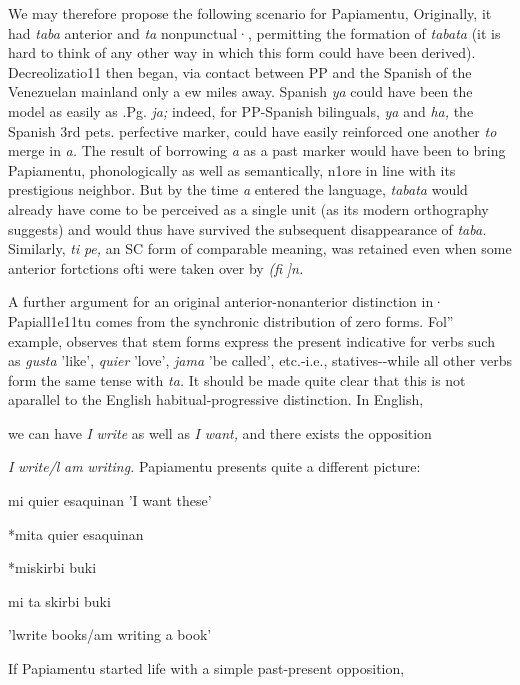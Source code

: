 We may therefore propose the following scenario for Papia\-mentu, Originally, it had \textit{taba} anterior and \textit{ta} nonpunctual·, permitting the formation of \textit{tabata} (it is hard to think of any other way in which this form could have been derived). Decreolizatio11 then began, via contact between PP and the Spanish of the Venezuelan mainland only a ew miles away. Spanish \textit{ya }could have been the model as easily as .Pg. \textit{ja;} indeed, for PP-Spanish bilinguals, \textit{ya }and \textit{ha,} the Spanish 3rd pets. perfective marker, could have easily reinforced one another \textit{to} merge in \textit{a.} The result of borrowing \textit{a} as a past marker would have been to bring Papiamentu, phonologically as well as semantically, n1ore in line with its prestigious neighbor. But by the time \textit{a} entered the language, \textit{tabata} would already have come to be perceived as a single unit (as its modern orthography suggests) and would thus have survived the subsequent disappearance of \textit{taba. }Similarly, \textit{ti} \textit{pe, }an SC form of comparable meaning, was retained even when some anterior fortctions ofti were taken over by \textit{(}\textit{fi} \textit{]n.}

A further argument for an original anterior-nonanterior distinc\-tion in· Papiall1e11tu comes from the synchronic distribution of zero forms. Fol'' example, \citet[107]{Goilo1953} observes that stem forms express the present indicative for verbs such as \textit{gusta} 'like', \textit{quier} 'love', \textit{jama} 'be called', etc.-i.e., statives-{}-while all other verbs form the same tense with \textit{ta.} It should be made quite clear that this is not aparallel to the English habitual-progressive distinction. In English,

we can have \textit{I} \textit{write} as well as \textit{I} \textit{want,} and there exists the opposition

\textit{I} \textit{write/l} \textit{am} \textit{writing.} Papiamentu presents quite a different picture:

\ea\label{ex:99}
 mi quier esaquinan 'I want these'
\glt
\z

\ea\label{ex:160}
 *mita quier esaquinan
\glt
\z

\ea\label{ex:101}
 *miskirbi buki
\glt
\z

\ea\label{ex:102}
 mi ta skirbi buki
\glt
\z

'lwrite books/am writing a book'

If Papiamentu started life with a simple past-present opposition,

